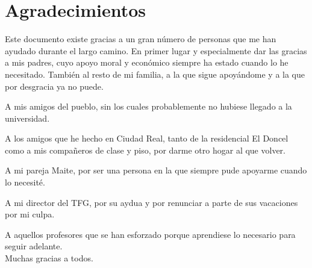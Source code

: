 \chapter{Agradecimientos}

Este documento existe gracias a un gran número de personas que me han ayudado durante el largo camino. En primer lugar y especialmente dar las gracias a mis padres, cuyo apoyo moral y económico siempre ha estado cuando lo he necesitado. También al resto de mi familia, a la que sigue apoyándome y a la que por desgracia ya no puede.

A mis amigos del pueblo, sin los cuales probablemente no hubiese llegado a la universidad.

A los amigos que he hecho en Ciudad Real, tanto de la residencial El Doncel como a mis compañeros de clase y piso, por darme otro hogar al que volver.

A mi pareja Maite, por ser una persona en la que siempre pude apoyarme cuando lo necesité.

A mi director del TFG, por su aydua y por renunciar a parte de sus vacaciones por mi culpa.

A aquellos profesores que se han esforzado porque aprendiese lo necesario para seguir adelante.\\

Muchas gracias a todos.

